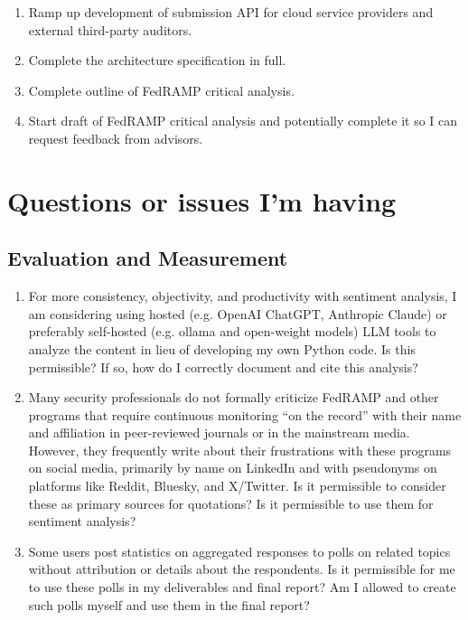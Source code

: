 \documentclass{jdf}
\begin{document}
\begin{enumerate}
    \item Ramp up development of submission API for cloud service providers and external third-party auditors.
    \item Complete the architecture specification in full.
    \item Complete outline of FedRAMP critical analysis.
    \item Start draft of FedRAMP critical analysis and potentially complete it so I can request feedback from advisors.
\end{enumerate}

\section*{Questions or issues I'm having}

\subsection*{Evaluation and Measurement}

\begin{enumerate}
    \item For more consistency, objectivity, and productivity with sentiment analysis, I am considering using hosted (e.g. OpenAI ChatGPT, Anthropic Claude) or preferably self-hosted (e.g. ollama and open-weight models) LLM tools to analyze the content in lieu of developing my own Python code. Is this permissible? If so, how do I correctly document and cite this analysis?
    \item Many security professionals do not formally criticize FedRAMP and other programs that require continuous monitoring ``on the record'' with their name and affiliation in peer-reviewed journals or in the mainstream media. However, they frequently write about their frustrations with these programs on social media, primarily by name on LinkedIn and with pseudonyms on platforms like Reddit, Bluesky, and X/Twitter. Is it permissible to consider these as primary sources for quotations? Is it permissible to use them for sentiment analysis?
    \item Some users post statistics on aggregated responses to polls on related topics without attribution or details about the respondents. Is it permissible for me to use these polls in my deliverables and final report? Am I allowed to create such polls myself and use them in the final report?
\end{enumerate}
\end{document}
